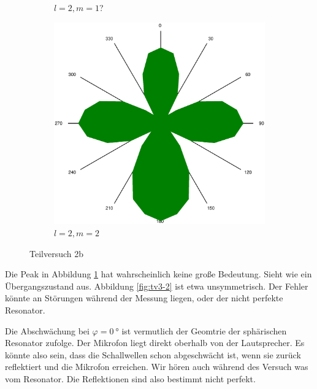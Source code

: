 \begin{figure}[!ht]
\begin{subfigure}{0.3\textwidth}
			\caption{$l = 2, m=1$?}
			\label{fig:tv3-3.5}
		\end{subfigure}
		\begin{subfigure}{0.3\textwidth}
			\centering
			\includegraphics[width=\textwidth]{images/tv3-peak4-angle.eps}
			\caption{$l = 2, m=2$}
			\label{fig:tv3-4}
		\end{subfigure}
	    \caption{Teilversuch 2b}
	\end{figure}

	Die Peak in Abbildung \ref{fig:tv3-3.5} hat wahrscheinlich keine große Bedeutung. Sieht wie ein Übergangszustand aus. Abbildung \ref{fig:tv3-2} ist etwa unsymmetrisch. Der Fehler könnte an Störungen während der Messung liegen, oder der nicht perfekte Resonator.

	Die Abschwächung bei $\varphi = \SI{0}{\degree}$ ist vermutlich der Geomtrie der sphärischen Resonator zufolge. Der Mikrofon liegt direkt oberhalb von der Lautsprecher. Es könnte also sein, dass die Schallwellen schon abgeschwächt ist, wenn sie zurück reflektiert und die Mikrofon erreichen. Wir hören auch während des Versuch was vom Resonator. Die Reflektionen sind also bestimmt nicht perfekt. 

